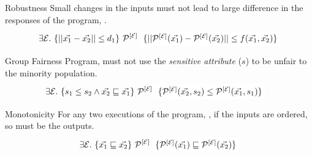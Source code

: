 \begin{frame}{Robustness}
    Small changes in the inputs must not lead to large difference in the responses of the program, \prog.
    \begin{align*}
        \exists \E. \ \{|| \vec{x_1} - \vec{x_2} || \leq d_1\} \ \proghole{}{\E} \ \colorbox{white}{$\{|| \proghole{}{\E}(\vec{x_1}) - \proghole{}{\E}(\vec{x_2}) || \leq f(\vec{x_1},\vec{x_2})\} $}
    \end{align*}
\end{frame}

\begin{frame}{Group Fairness}
    Program, \prog must not use the \textit{sensitive attribute} ($s$) to be unfair to the minority population.
    \begin{align*}
        \exists \E. \ \{{s_1} \leq {s_2} \land \vec{x_2} \sqsubseteq \vec{x_1}\} \ \proghole{}{\E} \ & \colorbox{white}{$\{\proghole{}{\E}(\vec{x_2}, {s_2}) \leq \proghole{}{\E}(\vec{x_1}, {s_1})\} $}
    \end{align*}
\end{frame}

\begin{frame}{Monotonicity}
    For any two executions of the program, \prog, if the inputs are ordered, so must be the outputs.
    \begin{align*}
        \exists \E. \ \{\vec{x_1} \sqsubseteq \vec{x_2}\} \ \proghole{}{\E}\ \colorbox{white}{$\{ \proghole{}{\E}(\vec{x_1}) \sqsubseteq \proghole{}{\E}(\vec{x_2}) \}$}
    \end{align*}
\end{frame}